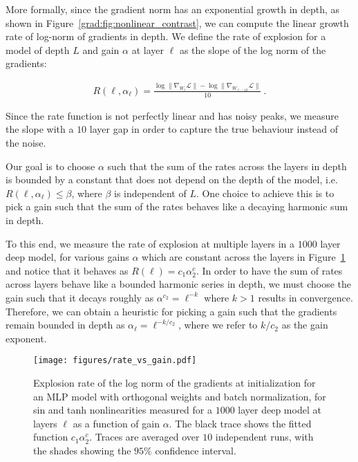 More formally, since the gradient norm has an exponential growth in depth, as shown in Figure~\ref{grad:fig:nonlinear_contrast}, we can compute the linear growth rate of log-norm of gradients in depth. We define the rate of explosion for a model of depth $L$ and gain $\alpha$ at layer $\ell$ as the slope of the log norm of the gradients:

\begin{align}
    R(\ell, \alpha_\ell) = \frac{\log \| \nabla_{W_\ell} \mathcal{L}\| - \log \| \nabla_{W_{\ell - 10}} \mathcal{L}\|}{10}~.
\end{align}

Since the rate function is not perfectly linear and has noisy peaks, we measure the slope with a $10$ layer gap in order to capture the true behaviour instead of the noise. 

Our goal is to choose $\alpha$ such that the sum of the rates across the layers in depth is bounded by a constant that does not depend on the depth of the model, i.e. $R(\ell, \alpha_\ell) \leq \beta$, where $\beta$ is independent of $L$. One choice to achieve this is to pick a gain such that the sum of the rates behaves like a decaying harmonic sum in depth.

To this end, we measure the rate of explosion at multiple layers in a $1000$ layer deep model, for various gains $\alpha$ which are constant across the layers in Figure~\ref{grad:fig:rate_vs_gain} and notice that it behaves as $R(\ell) = c_1 \alpha^c_2$. In order to have the sum of rates across layers behave like a bounded harmonic series in depth, we must choose the gain such that it decays roughly as $\alpha^{c_2} = \ell^{-k}$ where $k > 1$ results in convergence. Therefore, we can obtain a heuristic for picking a gain such that the gradients remain bounded in depth as $\alpha_\ell = \ell^{-k / c_2}$, where we refer to $k / c_2$ as the gain exponent.

\begin{figure}[ht]
    \centering
    \texttt{[image: figures/rate\_vs\_gain.pdf]}
    \caption{Explosion rate of the log norm of the gradients at initialization for an MLP model with
orthogonal weights and batch normalization, for sin and tanh nonlinearities measured for a $1000$
layer deep model at layers $\ell$ as a function of gain $\alpha$. The black trace shows the fitted function $c_1 \alpha^c_2$. Traces are averaged over $10$ independent runs, with the shades showing the $95\%$ confidence interval.}
    \label{grad:fig:rate_vs_gain}
\end{figure}

